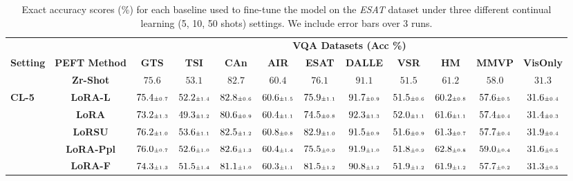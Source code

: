 \begin{table}
\caption{Exact accuracy scores (\%) for each baseline used to fine-tune the model on the \emph{ESAT} dataset under three different continual learning (5, 10, 50 shots)  settings. We include error bars over 3 runs.}
 \label{table:fine_tune_llm_eurosat}
 \vskip 0.15in
\begin{center}
\begin{small}
\begingroup
\setlength{\tabcolsep}{3.6pt}
\begin{tabular}{l c c c c c c c c c c c}
\toprule
 & & \multicolumn{10}{c}{\textbf{VQA Datasets (Acc \%)}}  \\
\cmidrule(lr){3-12}
\textbf{Setting} & \textbf{PEFT Method}  & \textbf{GTS} & \textbf{TSI} & \textbf{CAn} & \textbf{AIR} & \textbf{ESAT} & \textbf{DALLE} & \textbf{VSR} & \textbf{HM} & \textbf{MMVP} & \textbf{VisOnly} \\
\midrule
 & \textbf{Zr-Shot} & $75.6$ & $53.1$ & $82.7$ & $60.4$ & $76.1$ & $91.1$ & $51.5$ & $61.2$ & $58.0$ & $31.3$ \\
\midrule
\multirow{6}{*}{\textbf{CL-5}} & \textbf{LoRA-L} & $75.4 \mbox{\tiny\ensuremath{\pm 0.7}}$ & $52.2 \mbox{\tiny\ensuremath{\pm 1.4}}$ & $82.8 \mbox{\tiny\ensuremath{\pm 0.6}}$ & $60.6 \mbox{\tiny\ensuremath{\pm 1.5}}$ & $75.9 \mbox{\tiny\ensuremath{\pm 1.1}}$ & $91.7 \mbox{\tiny\ensuremath{\pm 0.9}}$ & $51.5 \mbox{\tiny\ensuremath{\pm 0.6}}$ & $60.2 \mbox{\tiny\ensuremath{\pm 0.8}}$ & $57.6 \mbox{\tiny\ensuremath{\pm 0.5}}$ & $31.6 \mbox{\tiny\ensuremath{\pm 0.4}}$ \\
& \textbf{LoRA} & $73.2 \mbox{\tiny\ensuremath{\pm 1.3}}$ & $49.3 \mbox{\tiny\ensuremath{\pm 1.2}}$ & $80.6 \mbox{\tiny\ensuremath{\pm 0.9}}$ & $60.4 \mbox{\tiny\ensuremath{\pm 1.1}}$ & $74.5 \mbox{\tiny\ensuremath{\pm 0.8}}$ & $92.3 \mbox{\tiny\ensuremath{\pm 1.3}}$ & $52.0 \mbox{\tiny\ensuremath{\pm 1.1}}$ & $61.6 \mbox{\tiny\ensuremath{\pm 1.1}}$ & $57.4 \mbox{\tiny\ensuremath{\pm 0.4}}$ & $31.4 \mbox{\tiny\ensuremath{\pm 0.3}}$ \\
& \textbf{LoRSU} & $76.2 \mbox{\tiny\ensuremath{\pm 1.0}}$ & $53.6 \mbox{\tiny\ensuremath{\pm 1.1}}$ & $82.5 \mbox{\tiny\ensuremath{\pm 1.2}}$ & $60.8 \mbox{\tiny\ensuremath{\pm 0.8}}$ & $82.9 \mbox{\tiny\ensuremath{\pm 1.0}}$ & $91.5 \mbox{\tiny\ensuremath{\pm 0.9}}$ & $51.6 \mbox{\tiny\ensuremath{\pm 0.9}}$ & $61.3 \mbox{\tiny\ensuremath{\pm 0.7}}$ & $57.7 \mbox{\tiny\ensuremath{\pm 0.4}}$ & $31.9 \mbox{\tiny\ensuremath{\pm 0.4}}$ \\
& \textbf{LoRA-Ppl} & $76.0 \mbox{\tiny\ensuremath{\pm 0.7}}$ & $52.6 \mbox{\tiny\ensuremath{\pm 1.0}}$ & $82.6 \mbox{\tiny\ensuremath{\pm 1.3}}$ & $60.4 \mbox{\tiny\ensuremath{\pm 1.4}}$ & $75.5 \mbox{\tiny\ensuremath{\pm 0.9}}$ & $91.9 \mbox{\tiny\ensuremath{\pm 1.0}}$ & $51.8 \mbox{\tiny\ensuremath{\pm 0.9}}$ & $62.8 \mbox{\tiny\ensuremath{\pm 0.8}}$ & $59.0 \mbox{\tiny\ensuremath{\pm 0.4}}$ & $31.6 \mbox{\tiny\ensuremath{\pm 0.5}}$ \\
& \textbf{LoRA-F} & $74.3 \mbox{\tiny\ensuremath{\pm 1.3}}$ & $51.5 \mbox{\tiny\ensuremath{\pm 1.4}}$ & $81.1 \mbox{\tiny\ensuremath{\pm 1.0}}$ & $60.3 \mbox{\tiny\ensuremath{\pm 1.1}}$ & $81.5 \mbox{\tiny\ensuremath{\pm 1.2}}$ & $90.8 \mbox{\tiny\ensuremath{\pm 1.2}}$ & $51.9 \mbox{\tiny\ensuremath{\pm 1.2}}$ & $61.9 \mbox{\tiny\ensuremath{\pm 1.2}}$ & $57.7 \mbox{\tiny\ensuremath{\pm 0.2}}$ & $31.3 \mbox{\tiny\ensuremath{\pm 0.5}}$ \\

\end{tabular}
\end{small}
\end{center}
\end{table}
